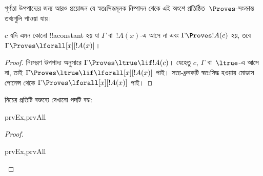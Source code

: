 \documentclass[../../../include/open-logic-section]{subfiles}
\begin{document}


\begin{explain}
  পূর্ণতা উপপাদ্যের জন্য আরও প্রয়োজন যে স্বতঃসিদ্ধমূলক নিষ্পাদন থেকে
  এই অংশে প্রতিষ্ঠিত~$\Proves$-সংক্রান্ত তথ্যগুলি পাওয়া যায়।
\end{explain}

\begin{thm}
 $c$ যদি এমন কোনো !!a{constant} হয়
যা $\Gamma$ বা~$!A(x)$-এ আসে না এবং $\Gamma \Proves !A(c)$ হয়,
তবে $\Gamma \Proves \lforall[x][!A(x)]$।
\end{thm}

\begin{proof}
নিঃসরণ উপপাদ্য অনুসারে $\Gamma \Proves \ltrue \lif !A(c)$। যেহেতু
$c$, $\Gamma$ বা~$\ltrue$-এ আসে না, তাই $\Gamma \Proves \ltrue
\lif \lforall[x][!A(x)]$ পাই। সত্য-ধ্রুবকটি স্বতঃসিদ্ধ হওয়ায় মোডাস পোনেন্স থেকে
$\Gamma \Proves \lforall[x][!A(x)]$ পাই।
\end{proof}

\begin{prop}
নিচের প্রতিটি বক্তব্যে দেখানো পদটি বদ্ধ:
\begin{tagenumerate}{prvEx,prvAll}

\end{tagenumerate}
\end{prop}

\begin{proof}
\begin{tagenumerate}{prvEx,prvAll}
\end{tagenumerate}
\end{proof}
\end{document}

